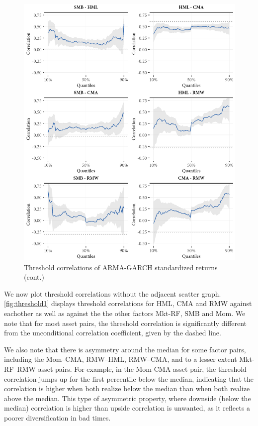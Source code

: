 \begin{figure}[!ht]
  \ContinuedFloat
  \centering

  \includegraphics[scale=1]{graphics/threshold2.png}

  \caption{Threshold correlations of ARMA-GARCH standardized returns (cont.)}
\end{figure}

We now plot threshold correlations without the adjacent scatter graph. \autoref{fig:threshold1} displays threshold correlations for HML, CMA and RMW against eachother as well as against the the other factors Mkt-RF, SMB and Mom. We note that for most asset pairs, the threshold correlation is significantly different from the unconditional correlation coefficient, given by the dashed line.

We also note that there is asymmetry around the median for some factor pairs, including the Mom--CMA, RMW--HML, RMW--CMA, and to a lesser extent Mkt-RF--RMW asset pairs. For example, in the Mom-CMA asset pair, the threshold correlation jumps up for the first percentile below the median, indicating that the correlation is higher when both realize below the median than when both realize above the median. This type of asymmetric property, where downside (below the median) correlation is higher than upside correlation is unwanted, as it reflects a poorer diversification in bad times. 

